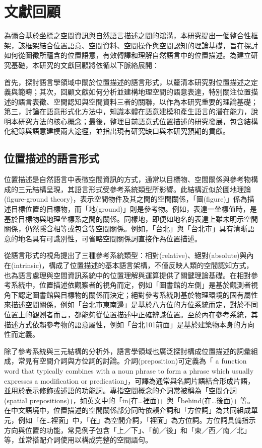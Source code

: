 
\chapter{文獻回顧}

為彌合基於坐標之空間資訊與自然語言描述之間的鴻溝，本研究提出一個整合性框架，該框架結合位置語意、空間資料、空間操作與空間認知的理論基礎，旨在探討如何從圖徵所蘊含的位置語意，有效轉譯和理解自然語言中的位置描述。為建立研究基礎，本研究的文獻回顧將依循以下脈絡展開：

首先，探討語言學領域中關於位置描述的語言形式，以釐清本研究對位置描述之定義與範疇；其次，回顧文獻如何分析並建構地理空間的語意表達，特別關注位置描述的語言表徵、空間認知與空間資料三者的關聯，以作為本研究重要的理論基礎；第三，討論在語意形式化方法中，知識本體在語意建模和產生語言的潛在能力，說明本研究方法的核心概念；最後，整理目前語意式位置描述的研究發展，包含結構化紀錄與語意建模兩大途徑，並指出現有研究缺口與本研究預期的貢獻。

\section{位置描述的語言形式}

位置描述是自然語言中表徵空間資訊的方式，通常以目標物、空間關係與參考物構成的三元結構呈現，其語言形式受參考系統類型所影響。此結構近似於圖地理論(figure-ground theory)，表示空間物件及其之間的空間關係，「圖(figure)」係為描述目標位置的目標物，而「地(ground)」則是參考物\parencite{RN93, RN104}。例如，表達一坐標值時，是基於目標物與地理坐標系之間的關係。同樣地，即便如地名的表達上雖未明示空間關係，仍然隱含相等或包含等空間關係。例如，「台北」與「台北市」具有清晰語意的地名具有可識別性，可省略空間關係詞直接作為位置描述\parencite{RN93}。

\textcite{RN2}從語言形式的視角提出了三種參考系統類型：相對(relative)、絕對(absolute)與內在(intrinsic)，構成了位置描述的基本語言架構，不僅反映人類的空間認知方式，也為語言處理與空間資訊系統中的位置理解與運算提供了關鍵理論基礎。在相對參考系統中，位置描述依觀察者的視角而定，例如「圖書館的左側」是基於觀測者視角下認定圖書館與目標物的關係而決定；絕對參考系統則基於物理環境的固有屬性來描述空間關係，例如「台北市東南邊」是基於八方位的方位系統而定，對於不同位置上的觀測者而言，都能夠從位置描述中正確辨識位置。至於內在參考系統，其描述方式依賴參考物的語意屬性，例如「台北101前面」是基於建築物本身的方向性而定義。

除了參考系統與三元結構的分析外，語言學領域也廣泛探討構成位置描述的詞彙組成，常見有空間介詞與方位詞的討論。介詞(preposition)可定義為「 a function word that typically combines with a noun phrase to form a phrase which usually expresses a modification or predication」\parencite{RN188}，可譯為通常與名詞片語結合形成片語，並用於表示修飾或述語的功能詞。專指空間概念的介詞常被稱為「空間介詞(spatial prepositions)」，如英文中的「in(在…裡面)」與「behind(在…後面)」等。在中文語境中，位置描述的空間關係部分同時依賴介詞和「方位詞」為共同組成單元，例如「在…裡面」中，「在」為空間介詞，「裡面」為方位詞\parencite{RN46, RN189, RN190}。方位詞具備指示方向與位置的功能，常見例子包含「上／下」、「前／後」和「東／西／南／北」等，並常搭配介詞使用以構成完整的空間語句。


